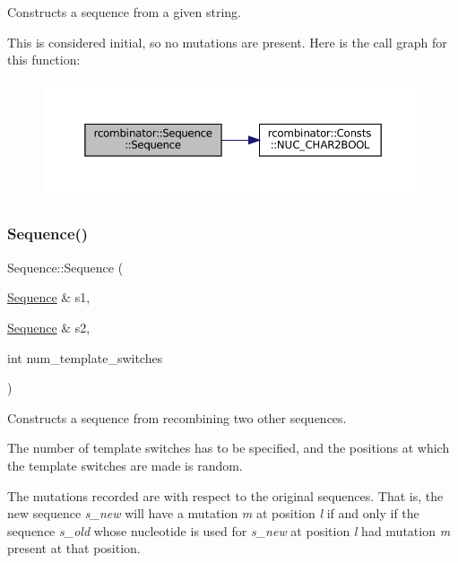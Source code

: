 Constructs a sequence from a given string. 

This is considered initial, so no mutations are present. Here is the call graph for this function\+:\nopagebreak
\begin{figure}[H]
\begin{center}
\leavevmode
\includegraphics[width=350pt]{classrcombinator_1_1Sequence_af5b3b62eba07f0e09f532fcf1681c289_cgraph}
\end{center}
\end{figure}
\mbox{\label{classrcombinator_1_1Sequence_a976b331689ec55d9d306281bbff5d22d}} 
\subsubsection{\texorpdfstring{Sequence()}{Sequence()}\hspace{0.1cm}{\footnotesize\ttfamily [3/3]}}
{\footnotesize\ttfamily Sequence\+::\+Sequence (\begin{DoxyParamCaption}\item[{\mbox{\hyperlink{classrcombinator_1_1Sequence}{Sequence}} \&}]{s1,  }\item[{\mbox{\hyperlink{classrcombinator_1_1Sequence}{Sequence}} \&}]{s2,  }\item[{int}]{num\+\_\+template\+\_\+switches }\end{DoxyParamCaption})}



Constructs a sequence from recombining two other sequences. 

The number of template switches has to be specified, and the positions at which the template switches are made is random.

The mutations recorded are with respect to the original sequences. That is, the new sequence {\itshape s\+\_\+new} will have a mutation {\itshape m} at position {\itshape l} if and only if the sequence {\itshape s\+\_\+old} whose nucleotide is used for {\itshape s\+\_\+new} at position {\itshape l} had mutation {\itshape m} present at that position.

